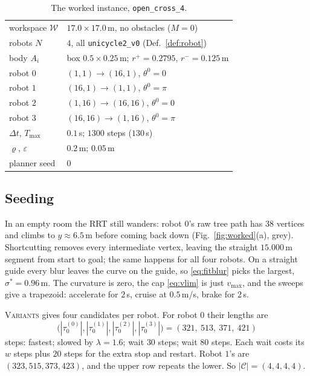 \documentclass[conference]{IEEEtran}
\theoremstyle{plain}
\theoremstyle{definition}
\newcommand{\W}{\mathcal{W}}
\newcommand{\Cand}{\mathcal{C}}
\newcommand{\clr}{\varepsilon}
\begin{document}
\begin{table}[t]
\caption{The worked instance, \texttt{open\_cross\_4}.}
\label{tab:instance}
\centering
\small
\begin{tabular}{ll}
\toprule
workspace $\W$ & $17.0 \times 17.0$\,m, no obstacles ($M = 0$) \\
robots $N$ & $4$, all \texttt{unicycle2\_v0} (Def.~\ref{def:robot}) \\
body $A_i$ & box $0.5 \times 0.25$\,m; $r^{+}=0.2795$, $r^{-}=0.125$\,m \\
robot $0$ & $(1,1) \rightarrow (16,1)$, $\theta^0 = 0$ \\
robot $1$ & $(16,1) \rightarrow (1,1)$, $\theta^0 = \pi$ \\
robot $2$ & $(1,16) \rightarrow (16,16)$, $\theta^0 = 0$ \\
robot $3$ & $(16,16) \rightarrow (1,16)$, $\theta^0 = \pi$ \\
$\Delta t$, $T_{\max}$ & $0.1$\,s; $1300$ steps ($130$\,s) \\
$\varrho$, $\clr$ & $0.2$\,m; $0.05$\,m \\
planner seed & $0$ \\
\bottomrule
\end{tabular}
\end{table}

\subsection{Seeding}

In an empty room the RRT still wanders: robot $0$'s raw tree path has $38$ vertices and climbs
to $y \approx 6.5$\,m before coming back down (Fig.~\ref{fig:worked}(a), grey). Shortcutting
removes every intermediate vertex, leaving the straight $15.000$\,m segment from start to
goal; the same happens for all four robots. On a straight guide every blur leaves the curve on
the guide, so \eqref{eq:fitblur} picks the largest, $\sigma^\ast = 0.96$\,m. The curvature is
zero, the cap \eqref{eq:vlim} is just $v_{\max}$, and the sweeps give a trapezoid: accelerate
for $2$\,s, cruise at $0.5$\,m/s, brake for $2$\,s.

\textsc{Variants} gives four candidates per robot. For robot $0$ their lengths are
\[
  \big(|\tau_0^{(0)}|,|\tau_0^{(1)}|,|\tau_0^{(2)}|,|\tau_0^{(3)}|\big) = (321,\ 513,\ 371,\ 421)
\]
steps: fastest; slowed by $\lambda = 1.6$; wait $30$ steps; wait $80$ steps. Each wait costs
its $w$ steps plus $20$ steps for the extra stop and restart. Robot $1$'s are
$(323, 515, 373, 423)$, and the upper row repeats the lower. So $|\Cand| = (4,4,4,4)$.
\end{document}
